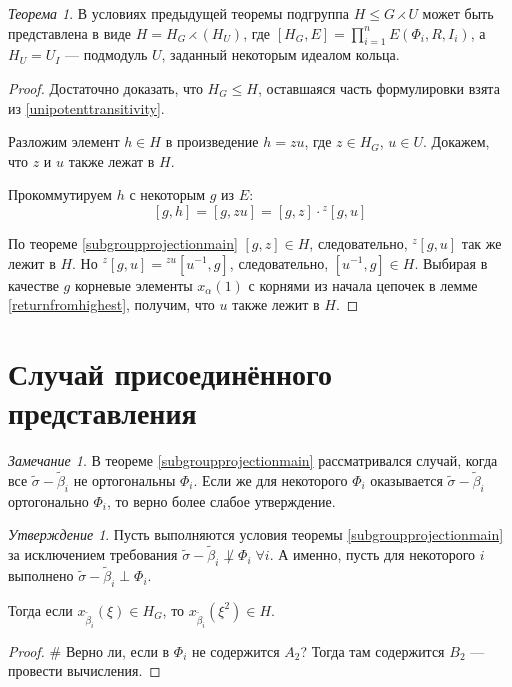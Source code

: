 \documentclass[10pt]{article}
\theoremstyle{break}
\theoremstyle{remark}
\newtheorem{prop}{Утверждение}
\newtheorem{thm}{Теорема}
\newtheorem{rem}{Замечание}
\renewcommand{\le}{\leqslant}
\begin{document}
\begin{thm}
В условиях предыдущей теоремы подгруппа $H\le G \rightthreetimes U$ может быть представлена в виде $H = H_G \rightthreetimes (H_U)$, где $[H_G,E] = \prod_{i=1}^n E(\Phi_i, R, I_i)$, а $H_U=U_I$ --- подмодуль $U$, заданный некоторым идеалом кольца.
\end{thm}
\begin{proof}
Достаточно доказать, что $H_G \le H$, оставшаяся часть формулировки взята из \ref{unipotenttransitivity}.

Разложим элемент $h \in H$ в произведение $h = z u$, где $z \in H_G$, $u \in U$. Докажем, что $z$ и $u$ также лежат в $H$.

Прокоммутируем $h$ с некоторым $g$ из $E$:
$$ [g, h] = [g,zu] = [g,z] \cdot {}^z[g,u] $$

По теореме \ref{subgroupprojectionmain} $[g,z]\in H$, следовательно, ${}^z[g,u]$ так же лежит в $H$. Но
$ {}^z[g,u] = {}^{zu}[u^{-1},g] $, следовательно, $[u^{-1},g] \in H$. Выбирая в качестве $g$ корневые элементы $x_\alpha(1)$ с корнями из начала цепочек в лемме \ref{returnfromhighest}, получим, что $u$ также лежит в $H$.
\end{proof}

\section*{Случай присоединённого представления}

\begin{rem}
В теореме \ref{subgroupprojectionmain} рассматривался случай, когда все $\widetilde\sigma-\widetilde\beta_i$ не ортогональны $\Phi_i$. Если же для некоторого $\Phi_i$ оказывается $\widetilde\sigma-\widetilde\beta_i$ ортогонально $\Phi_i$, то верно более слабое утверждение.
\end{rem}

\begin{prop}
Пусть выполняются условия теоремы \ref{subgroupprojectionmain} за исключением требования $\widetilde\sigma-\widetilde\beta_i \not\perp \Phi_i \; \forall i$. А именно, пусть для некоторого $i$ выполнено $\widetilde\sigma-\widetilde\beta_i \perp \Phi_i$.

Тогда если $x_{\widetilde\beta_i}(\xi) \in H_G$, то $x_{\widetilde\beta_i}(\xi^2) \in H$.
\end{prop}
\begin{proof}
\# Верно ли, если в $\Phi_i$ не содержится $A_2$? Тогда там содержится $B_2$ --- провести вычисления.
\end{proof}
\end{document}
